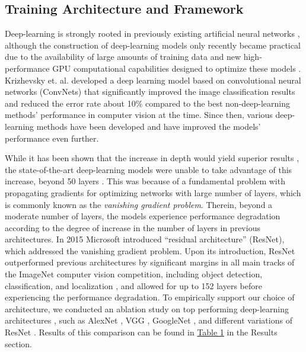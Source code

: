 \documentclass[review]{elsarticle}
\begin{document}
\subsection{Training Architecture and Framework}\label{architecture}
Deep-learning is strongly rooted in previously existing artificial neural networks \citep{lecun2015deep}, although the construction of deep-learning models only recently became practical due to the availability of large amounts of training data and new high-performance GPU computational capabilities designed to optimize these models \citep{lecun2015deep}. Krizhevsky et. al. developed a deep learning model \citep{krizhevsky2012imagenet} based on convolutional neural networks (ConvNets) \citep{le1990handwritten} that significantly improved the image classification results and reduced the error rate about 10\% compared to the best non-deep-learning methods’ performance in computer vision at the time. Since then, various deep-learning methods have been developed and have improved the models' performance even further.

While it has been shown that the increase in depth would yield superior results \citep{simonyan2014very}, the state-of-the-art deep-learning models were unable to take advantage of this increase, beyond 50 layers \citep{szegedy2015going,simonyan2014very}. This was because of a fundamental problem with propagating gradients for optimizing networks with large number of layers, which is commonly known as the \textit{vanishing gradient problem}\citep{simonyan2013deep,he2015deep}. Therein, beyond a moderate number of layers, the models experience performance degradation according to the degree of increase in the number of layers in previous architectures. In 2015 Microsoft introduced “residual architecture” (ResNet), which addressed the vanishing gradient problem. Upon its introduction, ResNet outperformed previous architectures by significant margins in all main tracks of the ImageNet computer vision competition, including object detection, classification, and localization \citep{he2015deep}, and allowed for up to 152 layers before experiencing the performance degradation. To empirically support our choice of architecture, we conducted an ablation study on top performing deep-learning architectures \citep{russakovsky2015imagenet}, such as AlexNet \citep{krizhevsky2012imagenet}, VGG \citep{simonyan2014very}, GoogleNet \citep{szegedy2015going}, and different variations of ResNet \citep{he2015deep}. Results of this comparison can be found in \hyperref[table:ablation]{Table 1} in the Results section.
\end{document}
